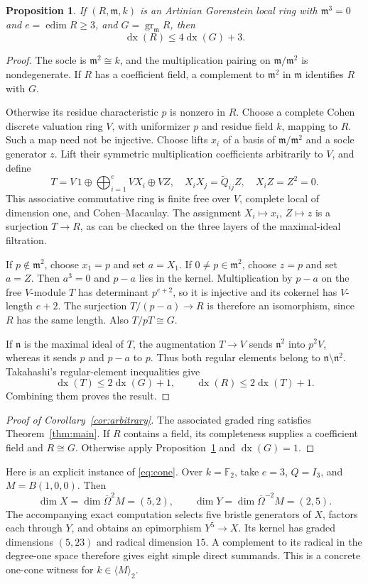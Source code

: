 \documentclass[11pt]{article}
\newtheorem{proposition}[theorem]{Proposition}
\theoremstyle{definition}\newtheorem{definition}[theorem]{Definition}
\theoremstyle{remark}\newtheorem{remark}[theorem]{Remark}
\newcommand{\m}{\mathfrak m}
\newcommand{\n}{\mathfrak n}
\newcommand{\dx}{\operatorname{dx}}
\newcommand{\gr}{\operatorname{gr}}
\newcommand{\edim}{\operatorname{edim}}
\newcommand{\Om}{\overline\Omega}
\begin{document}
\begin{proposition}\label{prop:transfer}
If $(R,\m,k)$ is an Artinian Gorenstein local ring with $\m^3=0$ and $e=\edim R\ge3$, and $G=\gr_{\m}R$, then
\[
 \dx(R)\le4\dx(G)+3.
\]
\end{proposition}
\begin{proof}
The socle is $\m^2\cong k$, and the multiplication pairing on $\m/\m^2$ is nondegenerate. If $R$ has a coefficient field, a complement to $\m^2$ in $\m$ identifies $R$ with $G$.

Otherwise its residue characteristic $p$ is nonzero in $R$. Choose a complete Cohen discrete valuation ring $V$, with uniformizer $p$ and residue field $k$, mapping to $R$. Such a map need not be injective. Choose lifts $x_i$ of a basis of $\m/\m^2$ and a socle generator $z$. Lift their symmetric multiplication coefficients arbitrarily to $V$, and define
\[
 T=V\,1\oplus\bigoplus_{i=1}^eV X_i\oplus V Z,
 \quad X_iX_j=\widetilde Q_{ij}Z,\quad X_iZ=Z^2=0.
\]
This associative commutative ring is finite free over $V$, complete local of dimension one, and Cohen--Macaulay. The assignment $X_i\mapsto x_i$, $Z\mapsto z$ is a surjection $T\to R$, as can be checked on the three layers of the maximal-ideal filtration.

If $p\notin\m^2$, choose $x_1=p$ and set $a=X_1$. If $0\ne p\in\m^2$, choose $z=p$ and set $a=Z$. Then $a^3=0$ and $p-a$ lies in the kernel. Multiplication by $p-a$ on the free $V$-module $T$ has determinant $p^{e+2}$, so it is injective and its cokernel has $V$-length $e+2$. The surjection $T/(p-a)\to R$ is therefore an isomorphism, since $R$ has the same length. Also $T/pT\cong G$.

If $\n$ is the maximal ideal of $T$, the augmentation $T\to V$ sends $\n^2$ into $p^2V$, whereas it sends $p$ and $p-a$ to $p$. Thus both regular elements belong to $\n\setminus\n^2$. Takahashi's regular-element inequalities \cite[Theorem 6.2]{T} give
\[
 \dx(T)\le2\dx(G)+1,
 \qquad \dx(R)\le2\dx(T)+1.
\]
Combining them proves the result.
\end{proof}

\begin{proof}[Proof of Corollary~\ref{cor:arbitrary}]
The associated graded ring satisfies Theorem~\ref{thm:main}. If $R$ contains a field, its completeness supplies a coefficient field and $R\cong G$. Otherwise apply Proposition~\ref{prop:transfer} and $\dx(G)=1$.
\end{proof}

Here is an explicit instance of \eqref{eq:cone}. Over $k=\mathbb F_2$, take $e=3$, $Q=I_3$, and $M=B(1,0,0)$. Then
\[
 \dim X=\dim\Om^2M=(5,2),\qquad
 \dim Y=\dim\Om^{-2}M=(2,5).
\]
The accompanying exact computation selects five bristle generators of $X$, factors each through $Y$, and obtains an epimorphism $Y^5\to X$. Its kernel has graded dimensions $(5,23)$ and radical dimension $15$. A complement to its radical in the degree-one space therefore gives eight simple direct summands. This is a concrete one-cone witness for $k\in\langle M\rangle_2$.
\end{document}
